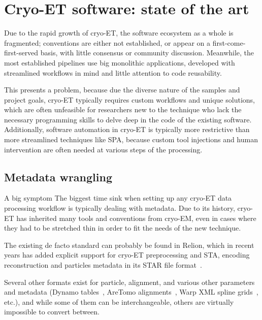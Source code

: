 \chapter[Cryo-ET software]{Cryo-ET software: state of the art}

Due to the rapid growth of cryo-ET, the software ecosystem as a whole is fragmented; conventions are either not established, or appear on a first-come-first-served basis, with little consensus or community discussion.
Meanwhile, the most established pipelines use big monolithic applications, developed with streamlined workflows in mind and little attention to code reusability.

This presents a problem, because due the diverse nature of the samples and project goals, cryo-ET typically requires custom workflows and unique solutions, which are often unfeasible for researchers new to the technique who lack the necessary programming skills to delve deep in the code of the existing software.
Additionally, software automation in cryo-ET is typically more restrictive than more streamlined techniques like SPA, because custom tool injections and human intervention are often needed at various steps of the processing.

\section{Metadata wrangling}

A big symptom The biggest time sink when setting up any cryo-ET data processing workflow is typically dealing with metadata.
Due to its history, cryo-ET has inherited many tools and conventions from cryo-EM, even in cases where they had to be stretched thin in order to fit the needs of the new technique.

The existing de facto standard can probably be found in Relion, which in recent years has added explicit support for cryo-ET preprocessing and STA, encoding reconstruction and particles metadata in its STAR file format~\cite{zivanovBayesianApproachSingleparticle2022,burtImageProcessingPipeline2024}.

Several other formats exist for particle, alignment, and various other parameters and metadata (Dynamo tables~\cite{castano-diezDynamoCatalogueGeometrical2017}, AreTomo alignments~\cite{zhengAreTomoIntegratedSoftware2022}, Warp XML spline grids~\cite{tegunovRealtimeCryoelectronMicroscopy2019}, etc.), and while some of them can be interchangeable, others are virtually impossible to convert between.

